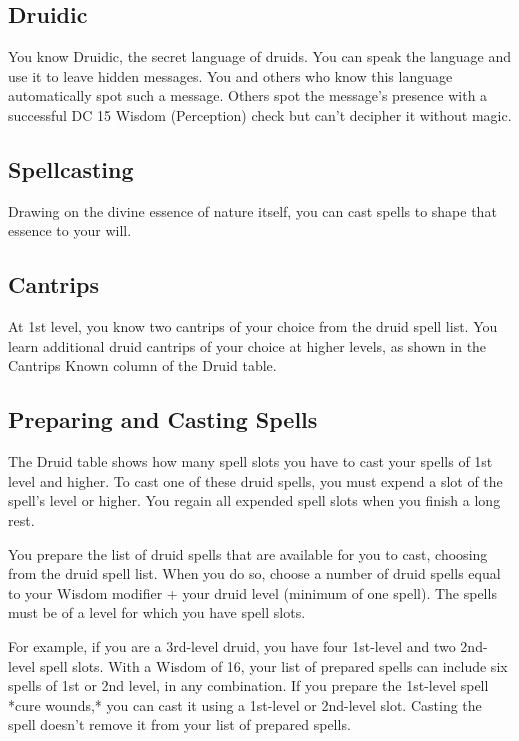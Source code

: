 \subsection{Druidic}

You know Druidic, the secret language of druids. You can speak the language and use it to leave hidden messages. You and others who know this language automatically spot such a message. Others spot the message’s presence with a successful DC 15 Wisdom (Perception) check but can’t decipher it without magic.

\subsection{Spellcasting}

Drawing on the divine essence of nature itself, you can cast spells to shape that essence to your will.

\subsection{Cantrips}

At 1st level, you know two cantrips of your choice from the druid spell list. You learn additional druid cantrips of your choice at higher levels, as shown in the Cantrips Known column of the Druid table.

\subsection{Preparing and Casting Spells}

The Druid table shows how many spell slots you have to cast your spells of 1st level and higher. To cast one of these druid spells, you must expend a slot of the spell’s level or higher. You regain all expended spell slots when you finish a long rest.

You prepare the list of druid spells that are available for you to cast, choosing from the druid spell list. When you do so, choose a number of druid spells equal to your Wisdom modifier + your druid level (minimum of one spell). The spells must be of a level for which you have spell slots.

For example, if you are a 3rd-level druid, you have four 1st-level and two 2nd-level spell slots. With a Wisdom of 16, your list of prepared spells can include six spells of 1st or 2nd level, in any combination. If you prepare the 1st-level spell *cure wounds,* you can cast it using a 1st-level or 2nd-level slot. Casting the spell doesn’t remove it from your list of prepared spells.

